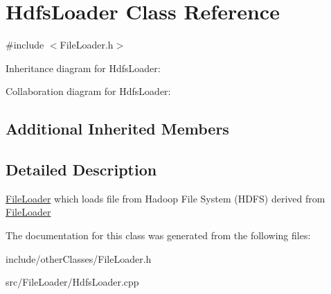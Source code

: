 \hypertarget{classHdfsLoader}{}\section{Hdfs\+Loader Class Reference}
\label{classHdfsLoader}


{\ttfamily \#include $<$File\+Loader.\+h$>$}



Inheritance diagram for Hdfs\+Loader\+:


Collaboration diagram for Hdfs\+Loader\+:
\subsection*{Additional Inherited Members}


\subsection{Detailed Description}
\hyperlink{classFileLoader}{File\+Loader} which loads file from Hadoop File System (H\+D\+FS) derived from \hyperlink{classFileLoader}{File\+Loader} 

The documentation for this class was generated from the following files\+:\begin{DoxyCompactItemize}
\item 
include/other\+Classes/File\+Loader.\+h\item 
src/\+File\+Loader/Hdfs\+Loader.\+cpp\end{DoxyCompactItemize}
